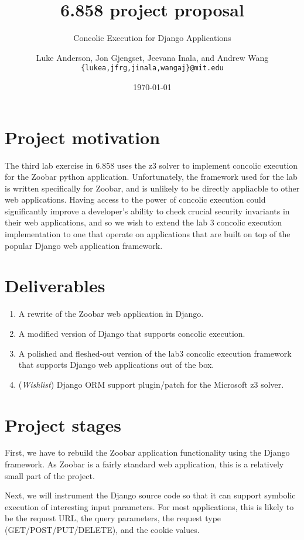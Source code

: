 \documentclass[a4page]{scrartcl}
\author{Luke Anderson, Jon Gjengset, Jeevana Inala, and Andrew Wang \\
	\texttt{\{lukea,jfrg,jinala,wangaj\}@mit.edu}
}
\title{6.858 project proposal}
\subtitle{Concolic Execution for Django Applications}
\date{\today}
\begin{document}
\maketitle

\section{Project motivation}
The third lab exercise in 6.858 uses the z3 solver to implement concolic
execution for the Zoobar python application. Unfortunately, the framework used
for the lab is written specifically for Zoobar, and is unlikely to be directly
appliacble to other web applications. Having access to the power of concolic
execution could significantly improve a developer's ability to check crucial
security invariants in their web applications, and so we wish to extend the lab
3 concolic execution implementation to one that operate on applications that
are built on top of the popular Django web application framework.

\section{Deliverables}
\begin{enumerate}
	\item A rewrite of the Zoobar web application in Django.
	\item A modified version of Django that supports concolic execution.
	\item A polished and fleshed-out version of the lab3 concolic execution
		framework that supports Django web applications out of the box.
	\item (\textit{Wishlist}) Django ORM support plugin/patch for the
		Microsoft z3 solver.
\end{enumerate}

\section{Project stages}
First, we have to rebuild the Zoobar application functionality using the Django
framework. As Zoobar is a fairly standard web application, this is a relatively
small part of the project.

Next, we will instrument the Django source code so that it can support symbolic
execution of interesting input parameters. For most applications, this is
likely to be the request URL, the query parameters, the request type
(GET/POST/PUT/DELETE), and the cookie values.
\end{document}
